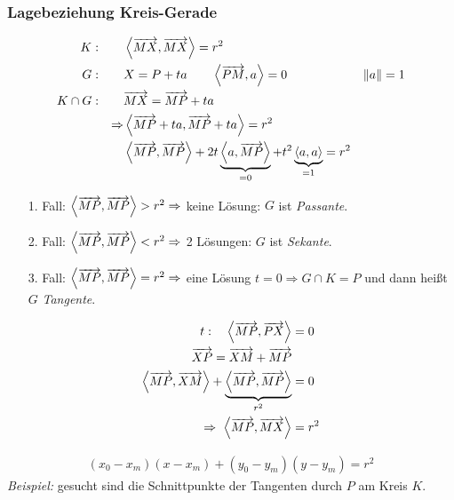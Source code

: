 \subsubsection*{Lagebeziehung Kreis-Gerade} %
\label{ssub:Lagebeziehung Kreis-Gerade}
\begin{align*}
    K: \qquad & \left\langle \overrightarrow{MX}, \overrightarrow{MX} \right\rangle = r^2\\
    G: \qquad & X = P + t a \qquad \left\langle \overrightarrow{PM}, a \right\rangle = 0 & \|a\| = 1\\
    K \cap G: \qquad & \overrightarrow{MX} = \overrightarrow{MP} + t a\\
    \Rightarrow & \left\langle \overrightarrow{MP} + t a, \overrightarrow{MP} + t a \right\rangle = r^2\\
    & \left\langle \overrightarrow{MP}, \overrightarrow{MP} \right\rangle + 2 t \underbrace{\left\langle a, \overrightarrow{MP} \right\rangle}_{=0} + t^2 \underbrace{\left\langle a,a \right\rangle}_{=1} = r^2
\end{align*}
\begin{itemize}
    \item[1. Fall:] $\left\langle \overrightarrow{MP}, \overrightarrow{MP} \right\rangle > r^2 \Rightarrow$ keine Lösung: $G$ ist \textit{Passante}.
    \item[2. Fall:] $\left\langle \overrightarrow{MP}, \overrightarrow{MP} \right\rangle < r^2 \Rightarrow$ 2 Lösungen: $G$ ist \textit{Sekante}.
    \item[3. Fall:] $\left\langle \overrightarrow{MP}, \overrightarrow{MP} \right\rangle = r^2 \Rightarrow$ eine Lösung $t = 0 \Rightarrow G \cap K = P$ und dann heißt $G$ \textit{Tangente}.
\end{itemize}
\begin{minipage}{0.6\textwidth}
    \begin{align*}
        t: \quad \left\langle \overrightarrow{MP}, \overrightarrow{PX} \right\rangle & = 0\\
        \overrightarrow{XP} = \overrightarrow{XM} + \overrightarrow{MP} & \\
        \left\langle \overrightarrow{MP}, \overrightarrow{XM} \right\rangle + \underbrace{\left\langle \overrightarrow{MP}, \overrightarrow{MP} \right\rangle}_{r^2} & = 0\\
        \Rightarrow \ \left\langle \overrightarrow{MP}, \overrightarrow{MX} \right\rangle & = r^2
    \end{align*}
\end{minipage}
\begin{minipage}{0.4\textwidth}
    \begin{center}
    \end{center}
\end{minipage}
\begin{align*}
    \boxed{\left( x_{0} - x_{m} \right)\left( x - x_{m} \right) + \left( y_{0} - y_{m} \right)\left( y - y_{m} \right) = r^2}
\end{align*}
\textit{Beispiel:} gesucht sind die Schnittpunkte der Tangenten durch $P$ am Kreis $K$.

